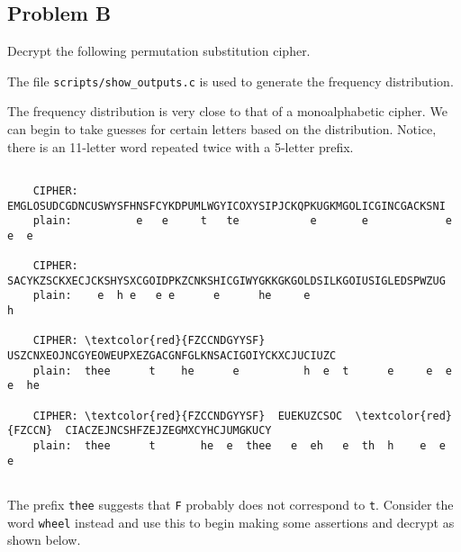 \documentclass[../hw_sols.tex]{subfiles}
\begin{document}
\subsection*{Problem B}

Decrypt the following permutation substitution cipher.

\begin{solution}

The file \verb|scripts/show_outputs.c| is used to generate the frequency 
distribution.




The frequency distribution is very close to that of a monoalphabetic cipher. 
We can begin to take guesses for certain letters based on the distribution. 
Notice, there is an 11-letter word repeated twice with a 5-letter prefix.

\begin{BVerbatim}[commandchars=\\\{\}]

    CIPHER: EMGLOSUDCGDNCUSWYSFHNSFCYKDPUMLWGYICOXYSIPJCKQPKUGKMGOLICGINCGACKSNI
    plain:          e   e     t   te           e       e            e   e  e

    CIPHER: SACYKZSCKXECJCKSHYSXCGOIDPKZCNKSHICGIWYGKKGKGOLDSILKGOIUSIGLEDSPWZUG
    plain:    e  h e   e e      e      he     e                              h

    CIPHER: \textcolor{red}{FZCCNDGYYSF}  USZCNXEOJNCGYEOWEUPXEZGACGNFGLKNSACIGOIYCKXCJUCIUZC
    plain:  thee      t    he      e          h  e  t      e     e  e  e  he

    CIPHER: \textcolor{red}{FZCCNDGYYSF}  EUEKUZCSOC  \textcolor{red}{FZCCN}  CIACZEJNCSHFZEJZEGMXCYHCJUMGKUCY
    plain:  thee      t       he  e  thee   e  eh   e  th  h    e  e      e
	
\end{BVerbatim}

The prefix \verb|thee| suggests that \verb|F| probably does not correspond to 
\verb|t|. Consider the word {\color{red}\verb|wheel|} instead and use this to 
begin making some assertions and decrypt as shown below.

\end{solution}
\end{document}
